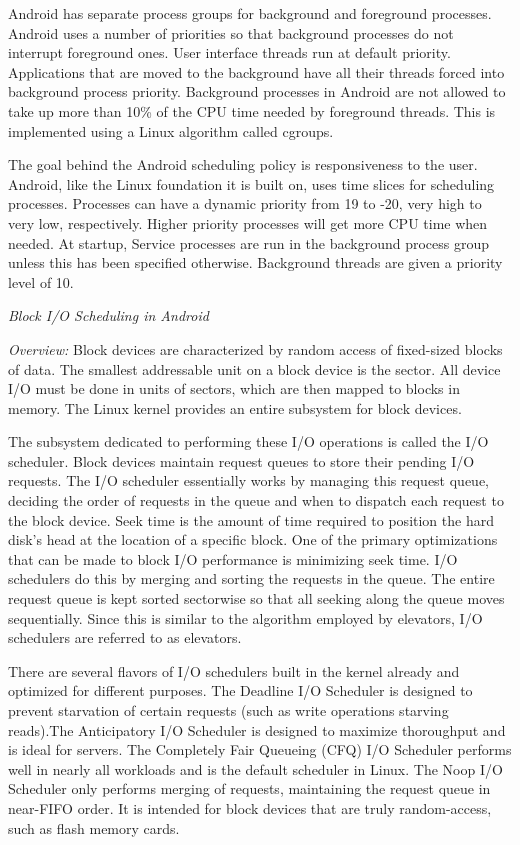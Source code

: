 \documentclass[letterpaper,10pt,titlepage]{article}
\newcommand{\ignore}[2]{\hspace{0in}#2} %
\newcommand{\tab}{\hspace*{2em}} %
\begin{document}
Android has separate process groups for background and foreground processes. Android uses a number of priorities so that background processes do not interrupt foreground ones. User interface threads run at default priority. Applications that are moved to the background have all their threads forced into background process priority. Background processes in Android are not allowed to take up more than 10\% of the CPU time needed by foreground threads. This is implemented using a Linux algorithm called cgroups. \cite{Hackborn}

The goal behind the Android scheduling policy is responsiveness to the user. Android, like the Linux foundation it is built on, uses time slices for scheduling processes. Processes can have a dynamic priority from 19 to -20, very high to very low, respectively. Higher priority processes will get more CPU time when needed. At startup, Service processes are run in the background process group unless this has been specified otherwise. Background threads are given a priority level of 10. \cite{gomo}

\emph{Block I/O Scheduling in Android}

\tab \emph{Overview:} Block devices are characterized by random access of fixed-sized blocks of data. The smallest addressable unit on a block device is the sector. All device I/O must be done in units of sectors, which are then mapped to blocks in memory\ignore{[Source: Book pg. 289-290]}. The Linux kernel provides an entire subsystem for block devices. 

\tab The subsystem dedicated to performing these I/O operations is called the I/O scheduler. Block devices maintain request queues to store their pending I/O requests\ignore{[Source: Book pg. 297]}. The I/O scheduler essentially works by managing this request queue, deciding the order of requests in the queue and when to dispatch each request to the block device. Seek time is the amount of time required to position the hard disk's head at the location of a specific block. One of the primary optimizations that can be made to block I/O performance is minimizing seek time. I/O schedulers do this by merging and sorting the requests in the queue. The entire request queue is kept sorted sectorwise so that all seeking along the queue moves sequentially. Since this is similar to the algorithm employed by elevators, I/O schedulers are referred to as elevators\ignore{[Source: Book pg. 298-299]}. 

\tab There are several flavors of I/O schedulers built in the kernel already and optimized for different purposes. The Deadline I/O Scheduler is designed to prevent starvation of certain requests (such as write operations starving reads).\ignore{[Source: Book pg. 300]} The Anticipatory I/O Scheduler is designed to maximize thoroughput and is ideal for servers\ignore{[Source: Book pg. 303]}. The Completely Fair Queueing (CFQ) I/O Scheduler performs well in nearly all workloads and is the default scheduler in Linux\ignore{[Source: Book pg. 303]}. The Noop I/O Scheduler only performs merging of requests, maintaining the request queue in near-FIFO order. It is intended for block devices that are truly random-access, such as flash memory cards\ignore{[Source: Book pg. 304]}.
\end{document}

